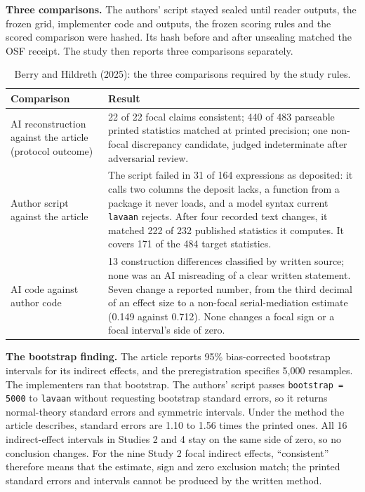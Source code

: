 \documentclass[11pt]{article}
\begin{document}
\textbf{Three comparisons.} The authors' script stayed sealed until reader outputs, the frozen grid, implementer code and outputs, the frozen scoring rules and the scored comparison were hashed. Its hash before and after unsealing matched the OSF receipt. The study then reports three comparisons separately.
\begin{table}[H]\centering\small
\begin{tabularx}{\linewidth}{@{}p{.30\linewidth}Y@{}}\toprule
Comparison & Result\\\midrule
AI reconstruction against the article (protocol outcome) & 22 of 22 focal claims consistent; 440 of 483 parseable printed statistics matched at printed precision; one non-focal discrepancy candidate, judged indeterminate after adversarial review.\\
Author script against the article & The script failed in 31 of 164 expressions as deposited: it calls two columns the deposit lacks, a function from a package it never loads, and a model syntax current \texttt{lavaan} rejects. After four recorded text changes, it matched 222 of 232 published statistics it computes. It covers 171 of the 484 target statistics.\\
AI code against author code & 13 construction differences classified by written source; none was an AI misreading of a clear written statement. Seven change a reported number, from the third decimal of an effect size to a non-focal serial-mediation estimate (0.149 against 0.712). None changes a focal sign or a focal interval's side of zero.\\\bottomrule
\end{tabularx}\caption{Berry and Hildreth (2025): the three comparisons required by the study rules.}\label{tab:berry-comparisons}\end{table}

\textbf{The bootstrap finding.} The article reports 95\% bias-corrected bootstrap intervals for its indirect effects, and the preregistration specifies 5,000 resamples. The implementers ran that bootstrap. The authors' script passes \texttt{bootstrap = 5000} to \texttt{lavaan} without requesting bootstrap standard errors, so it returns normal-theory standard errors and symmetric intervals. Under the method the article describes, standard errors are 1.10 to 1.56 times the printed ones. All 16 indirect-effect intervals in Studies 2 and 4 stay on the same side of zero, so no conclusion changes. For the nine Study 2 focal indirect effects, ``consistent'' therefore means that the estimate, sign and zero exclusion match; the printed standard errors and intervals cannot be produced by the written method.
\end{document}
